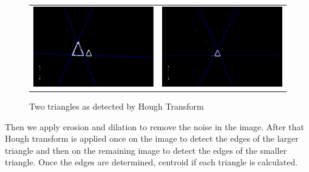 \documentclass[11pt]{report}
\begin{document}
\begin{figure}[H]
\center
\begin{tabular}{cc}
\includegraphics[scale=0.3]{0002l.png} & 
\includegraphics[scale=0.3]{0002s.png}
\end{tabular}
\label{tab:gt}
\caption{Two triangles as detected by Hough Transform}
\end{figure}
Then we apply erosion and dilation to remove the noise in the image. After that Hough transform is applied once on the image to detect the edges of the larger triangle and then on the remaining image to detect the edges of the smaller triangle. Once the edges are determined, centroid if each triangle is calculated.\\
\end{document}

